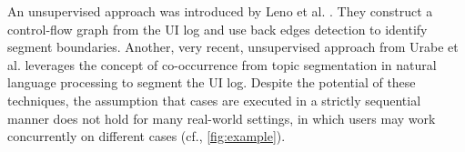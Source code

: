 An unsupervised approach was introduced by Leno et al. \cite{leno2020identifying}. They construct a control-flow graph from the UI log and use back edges detection to identify segment boundaries. Another, very recent, unsupervised approach from Urabe et al. \cite{Urabe21} leverages the concept of co-occurrence from topic segmentation in natural language processing to segment the UI log. Despite the potential of these techniques, 
the assumption that cases are executed in a strictly sequential manner does not hold for many real-world settings, in which users may work concurrently on different cases (cf., \autoref{fig:example}).


